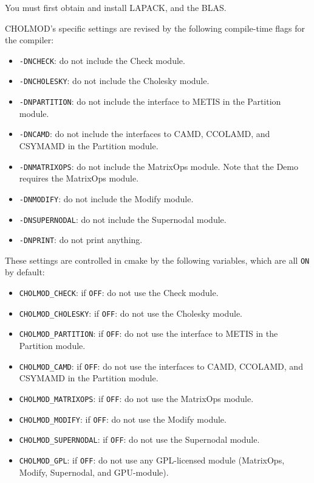 \documentclass[11pt]{article}
\begin{document}
You must first obtain and install LAPACK, and the BLAS.

\noindent
CHOLMOD's specific settings are revised by the following compile-time flags
for the compiler:
\begin{itemize}
\item {\tt -DNCHECK}:       do not include the Check module.
\item {\tt -DNCHOLESKY}:    do not include the Cholesky module.
\item {\tt -DNPARTITION}:   do not include the interface to METIS in
                            the Partition module.
\item {\tt -DNCAMD}:         do not include the interfaces to CAMD, CCOLAMD,
                            and CSYMAMD in the Partition module.
\item {\tt -DNMATRIXOPS}:   do not include the MatrixOps module.
                            Note that the Demo requires the MatrixOps module.
\item {\tt -DNMODIFY}:      do not include the Modify module.
\item {\tt -DNSUPERNODAL}:  do not include the Supernodal module.
\item {\tt -DNPRINT}:       do not print anything.
\end{itemize}

These settings are controlled in cmake by the following variables, which
are all \verb'ON' by default:
\begin{itemize}
\item \verb'CHOLMOD_CHECK':      if \verb'OFF': do not use the Check module.
\item \verb'CHOLMOD_CHOLESKY':   if \verb'OFF': do not use the Cholesky module.
\item \verb'CHOLMOD_PARTITION':  if \verb'OFF': do not use the interface to METIS in
                                 the Partition module.
\item \verb'CHOLMOD_CAMD':       if \verb'OFF':    do not use the interfaces to CAMD, CCOLAMD,
                                 and CSYMAMD in the Partition module.
\item \verb'CHOLMOD_MATRIXOPS':  if \verb'OFF':   do not use the MatrixOps module.
\item \verb'CHOLMOD_MODIFY':     if \verb'OFF':  do not use the Modify module.
\item \verb'CHOLMOD_SUPERNODAL': if \verb'OFF':   do not use the Supernodal module.
\item \verb'CHOLMOD_GPL':   if \verb'OFF': do not use any GPL-licensed module
    (MatrixOps, Modify, Supernodal, and GPU-module).
\end{itemize}
\end{document}
